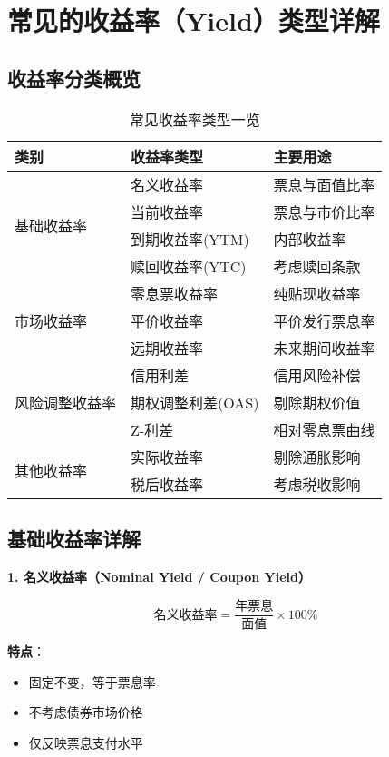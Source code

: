 \section{常见的收益率（Yield）类型详解}

\subsection{收益率分类概览}

\begin{table}[H]
\centering
\caption{常见收益率类型一览}
\begin{tabular}{|l|l|l|}
\hline
\textbf{类别} & \textbf{收益率类型} & \textbf{主要用途} \\
\hline
\multirow{4}{*}{基础收益率} & 名义收益率 & 票息与面值比率 \\
& 当前收益率 & 票息与市价比率 \\
& 到期收益率(YTM) & 内部收益率 \\
& 赎回收益率(YTC) & 考虑赎回条款 \\
\hline
\multirow{3}{*}{市场收益率} & 零息票收益率 & 纯贴现收益率 \\
& 平价收益率 & 平价发行票息率 \\
& 远期收益率 & 未来期间收益率 \\
\hline
\multirow{3}{*}{风险调整收益率} & 信用利差 & 信用风险补偿 \\
& 期权调整利差(OAS) & 剔除期权价值 \\
& Z-利差 & 相对零息票曲线 \\
\hline
\multirow{2}{*}{其他收益率} & 实际收益率 & 剔除通胀影响 \\
& 税后收益率 & 考虑税收影响 \\
\hline
\end{tabular}
\end{table}

\subsection{基础收益率详解}

\textbf{1. 名义收益率（Nominal Yield / Coupon Yield）}

\begin{equation}
\text{名义收益率} = \frac{\text{年票息}}{\text{面值}} \times 100\%
\end{equation}

\textbf{特点}：
\begin{itemize}
    \item 固定不变，等于票息率
    \item 不考虑债券市场价格
    \item 仅反映票息支付水平
\end{itemize}

